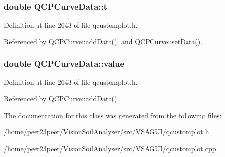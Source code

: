\subsubsection[{t}]{\setlength{\rightskip}{0pt plus 5cm}double Q\+C\+P\+Curve\+Data\+::t}\label{class_q_c_p_curve_data_aecc395525be28e9178a088793beb3ff3}


Definition at line 2643 of file qcustomplot.\+h.



Referenced by Q\+C\+P\+Curve\+::add\+Data(), and Q\+C\+P\+Curve\+::set\+Data().

\hypertarget{class_q_c_p_curve_data_a72b39b8e1dbf7b45382ebd48419b6828}{}
\subsubsection[{value}]{\setlength{\rightskip}{0pt plus 5cm}double Q\+C\+P\+Curve\+Data\+::value}\label{class_q_c_p_curve_data_a72b39b8e1dbf7b45382ebd48419b6828}


Definition at line 2643 of file qcustomplot.\+h.



Referenced by Q\+C\+P\+Curve\+::add\+Data().



The documentation for this class was generated from the following files\+:\begin{DoxyCompactItemize}
\item 
/home/peer23peer/\+Vision\+Soil\+Analyzer/src/\+V\+S\+A\+G\+U\+I/\hyperlink{qcustomplot_8h}{qcustomplot.\+h}\item 
/home/peer23peer/\+Vision\+Soil\+Analyzer/src/\+V\+S\+A\+G\+U\+I/\hyperlink{qcustomplot_8cpp}{qcustomplot.\+cpp}\end{DoxyCompactItemize}
